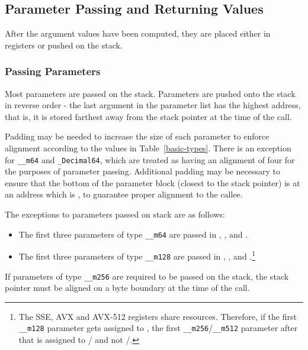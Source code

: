 \subsection{Parameter Passing and Returning Values}
\label{sec-calling-conventions}

After the argument values have been computed, they are placed either in
registers or pushed on the stack.

\subsubsection{Passing Parameters}

Most parameters are passed on the stack. Parameters are pushed onto the
stack in reverse order - the last argument in the parameter list has the
highest address, that is, it is stored farthest away from the stack pointer
at the time of the call.

Padding may be needed to increase the size of each parameter to enforce
alignment according to the values in Table~\ref{basic-types}.  There is
an exception for \texttt{__m64} and \texttt{_Decimal64}, which are treated
as having an
alignment of four for the purposes of parameter passing.  Additional
padding may be necessary to ensure that the bottom of the parameter block
(closest to the stack pointer) is at an address which is ,
to guarantee proper alignment to the callee.

The exceptions to parameters passed on stack are as follows:
\begin{itemize}
  \item The first three parameters of type \texttt{__m64} are passed in
	, , and .
  \item The first three parameters of type \texttt{__m128} are passed in
	, , and .\footnote{The SSE, AVX
	and AVX-512 registers share resources. Therefore, if the first
	\texttt{__m128} parameter gets assigned to  , the
	first \texttt{__m256}/\texttt{__m512} parameter after that is
	assigned to / and not
	/.}
\end{itemize}

If parameters of type \texttt{__m256} are required to be passed on the
stack, the stack pointer must be aligned on a  byte boundary
at the time of the call.

